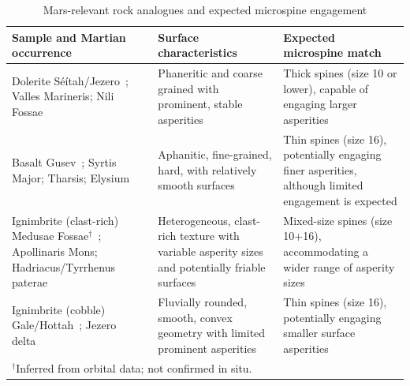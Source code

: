 \documentclass[letterpaper, 10 pt, conference, twoside]{ieeetran}
\begin{document}
\begin{table}[t]
\caption{Mars-relevant rock analogues and expected microspine engagement}
\label{tab:analogues}
\centering
\footnotesize
\renewcommand{\arraystretch}{1.35}
\setlength{\tabcolsep}{5pt}
\begin{tabular}{p{1.8cm} p{2.8cm} p{3.2cm}}
\hline
\textbf{Sample and Martian occurrence} &
\textbf{Surface characteristics} &
\textbf{Expected microspine match} \\
\hline

Dolerite \newline
{\scriptsize S\'e\'itah/Jezero~\cite{Farley2022JezeroIgneous};
Valles Marineris; Nili Fossae} &
Phaneritic and coarse grained with prominent, stable asperities &
Thick spines (size 10 or lower), capable of engaging larger asperities \\

Basalt \newline
{\scriptsize Gusev~\cite{Squyres2004Spirit};
Syrtis Major; Tharsis; Elysium} &
Aphanitic, fine-grained, hard, with relatively smooth surfaces &
Thin spines (size 16), potentially engaging finer asperities,
although limited engagement is expected \\

Ignimbrite (clast-rich) \newline
{\scriptsize Medusae Fossae$^\dagger$~\cite{Mandt2008MFF};
Apollinaris Mons; Hadriacus/Tyrrhenus paterae} &
Heterogeneous, clast-rich texture with variable asperity sizes and
potentially friable surfaces &
Mixed-size spines (size 10+16), accommodating a wider range
of asperity sizes \\

Ignimbrite (cobble) \newline
{\scriptsize Gale/Hottah~\cite{Williams2013Hottah};
Jezero delta~\cite{Mangold2021JezeroDelta}} &
Fluvially rounded, smooth, convex geometry with limited prominent asperities &
Thin spines (size 16), potentially engaging smaller surface asperities \\

\hline
\multicolumn{3}{l}{\scriptsize $^\dagger$Inferred from orbital data; not confirmed in situ.} \\
\hline
\end{tabular}
\vspace{-3mm}
\end{table}



\end{document}
